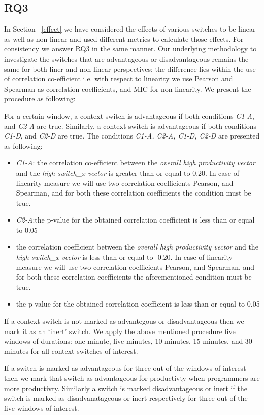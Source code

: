 \subsection{RQ3}

In Section ~\ref{effect} we have considered the effects of various switches to be linear as well as non-linear and used different metrics to calculate those effects. For consistency we answer RQ3 in the same manner. Our underlying methodology to investigate the switches that are advantageous or disadvantageous remains the same for both liner and non-linear perspectives; the difference lies within the use of correlation co-efficient i.e. with respect to linearity we use Pearson and Spearman as correlation coefficients, and MIC for non-linearity. We present the procedure as following:  

For a certain window, a context switch is advantageous if both conditions \textit{C1-A}, and \textit{C2-A} are true. Similarly, a context switch is advantageous if both conditions \textit{C1-D}, and \textit{C2-D} are true. The conditions \textit{C1-A, C2-A, C1-D, C2-D} are presented as following:   

\begin{itemize}
\item{\textit{C1-A}: the correlation co-efficient between the \textit{overall high productivity vector} and the \textit{high switch\_x vector} is greater than or equal to 0.20. In case of linearity measure 
we will use two correlation coefficients Pearson, and Spearman, and for both these correlation coefficients the condition must be true.}

\item{\textit{C2-A}:the p-value for the obtained correlation coefficient is less than or equal to 0.05}

\item{the correlation coefficient between the \textit{overall high productivity vector} and the \textit{high switch\_x vector} is less than or equal to -0.20. In case of linearity measure we will use two correlation coefficients Pearson, and Spearman, and for both these correlation coefficients the aforementioned condition must be true.}

\item{the p-value for the obtained correlation coefficient is less than or equal to 0.05}
\end{itemize}

If a context switch is not marked as advantegous or disadvantageous then we mark it as an `inert' switch.  We apply the above mentioned procedure five windows of durations: one minute, five minutes, 10 minutes, 15 minutes, and 30 minutes for all context switches of interest. 

If a switch is marked as advantageous for three out of the windows of interest then we mark that switch as advantageous for productivty when programmers are more productivty. 
Similarly a switch is marked disadvantageous or inert if the switch is marked as disadvanatageous or inert respectively for three out of the five windows of interest. 
 

 